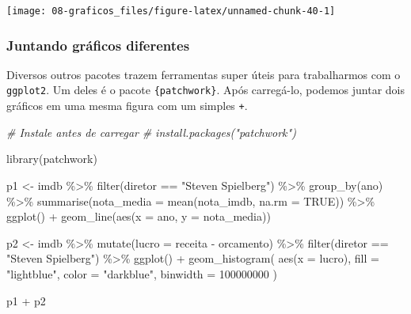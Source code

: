 \documentclass[
]{book}
\newenvironment{Shaded}{\begin{snugshade}}{\end{snugshade}}
\newcommand{\AttributeTok}[1]{\textcolor[rgb]{0.77,0.63,0.00}{#1}}
\newcommand{\CommentTok}[1]{\textcolor[rgb]{0.56,0.35,0.01}{\textit{#1}}}
\newcommand{\ConstantTok}[1]{\textcolor[rgb]{0.00,0.00,0.00}{#1}}
\newcommand{\DecValTok}[1]{\textcolor[rgb]{0.00,0.00,0.81}{#1}}
\newcommand{\FunctionTok}[1]{\textcolor[rgb]{0.00,0.00,0.00}{#1}}
\newcommand{\NormalTok}[1]{#1}
\newcommand{\OtherTok}[1]{\textcolor[rgb]{0.56,0.35,0.01}{#1}}
\newcommand{\SpecialCharTok}[1]{\textcolor[rgb]{0.00,0.00,0.00}{#1}}
\newcommand{\StringTok}[1]{\textcolor[rgb]{0.31,0.60,0.02}{#1}}
\begin{document}
\begin{center}\texttt{[image: 08-graficos\_files/figure-latex/unnamed-chunk-40-1]} \end{center}

\hypertarget{juntando-gruxe1ficos-diferentes}{%
\subsubsection*{Juntando gráficos diferentes}\label{juntando-gruxe1ficos-diferentes}}

Diversos outros pacotes trazem ferramentas super úteis para trabalharmos com o \texttt{ggplot2}. Um deles é o pacote \texttt{\{patchwork\}}. Após carregá-lo, podemos juntar dois gráficos em uma mesma figura com um simples \texttt{+}.

\begin{Shaded}
\begin{Highlighting}[]
\CommentTok{\# Instale antes de carregar}
\CommentTok{\# install.packages("patchwork")}

\FunctionTok{library}\NormalTok{(patchwork)}

\NormalTok{p1 }\OtherTok{\textless{}{-}}\NormalTok{ imdb }\SpecialCharTok{\%\textgreater{}\%} 
  \FunctionTok{filter}\NormalTok{(diretor }\SpecialCharTok{==} \StringTok{"Steven Spielberg"}\NormalTok{) }\SpecialCharTok{\%\textgreater{}\%}
  \FunctionTok{group\_by}\NormalTok{(ano) }\SpecialCharTok{\%\textgreater{}\%} 
  \FunctionTok{summarise}\NormalTok{(}\AttributeTok{nota\_media =} \FunctionTok{mean}\NormalTok{(nota\_imdb, }\AttributeTok{na.rm =} \ConstantTok{TRUE}\NormalTok{)) }\SpecialCharTok{\%\textgreater{}\%} 
  \FunctionTok{ggplot}\NormalTok{() }\SpecialCharTok{+}
  \FunctionTok{geom\_line}\NormalTok{(}\FunctionTok{aes}\NormalTok{(}\AttributeTok{x =}\NormalTok{ ano, }\AttributeTok{y =}\NormalTok{ nota\_media))}

\NormalTok{p2 }\OtherTok{\textless{}{-}}\NormalTok{ imdb }\SpecialCharTok{\%\textgreater{}\%} 
  \FunctionTok{mutate}\NormalTok{(}\AttributeTok{lucro =}\NormalTok{ receita }\SpecialCharTok{{-}}\NormalTok{ orcamento) }\SpecialCharTok{\%\textgreater{}\%} 
  \FunctionTok{filter}\NormalTok{(diretor }\SpecialCharTok{==} \StringTok{"Steven Spielberg"}\NormalTok{) }\SpecialCharTok{\%\textgreater{}\%} 
  \FunctionTok{ggplot}\NormalTok{() }\SpecialCharTok{+}
  \FunctionTok{geom\_histogram}\NormalTok{(}
    \FunctionTok{aes}\NormalTok{(}\AttributeTok{x =}\NormalTok{ lucro),}
    \AttributeTok{fill =} \StringTok{"lightblue"}\NormalTok{, }
    \AttributeTok{color =} \StringTok{"darkblue"}\NormalTok{, }
    \AttributeTok{binwidth =} \DecValTok{100000000}
\NormalTok{  )}

\NormalTok{p1 }\SpecialCharTok{+}\NormalTok{ p2}
\end{Highlighting}
\end{Shaded}
\end{document}
